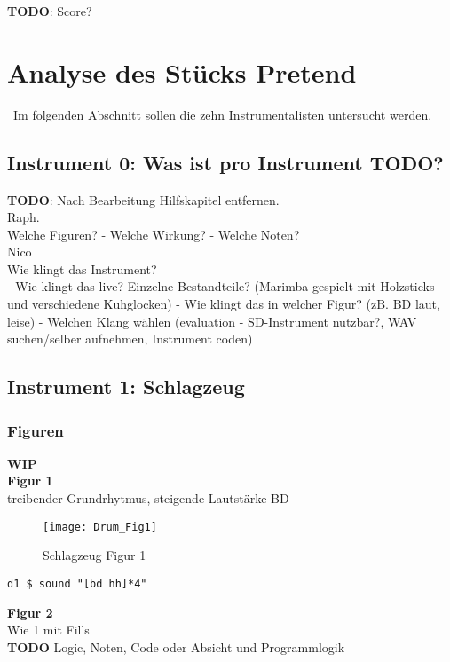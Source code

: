 \documentclass[
10pt, %
a4paper, %
oneside, %
headinclude,footinclude, %
BCOR5mm, %
]{scrartcl}
\begin{document}
{\color{red}\textbf{TODO}}: Score?

\section{Analyse des Stücks Pretend}\
Im folgenden Abschnitt sollen die zehn Instrumentalisten untersucht werden.

\subsection{Instrument 0: Was ist pro Instrument TODO?}
{\color{red}\textbf{TODO}}: Nach Bearbeitung Hilfskapitel entfernen.\\

Raph.\\
Welche Figuren?
- Welche Wirkung?
- Welche Noten?\\

Nico\\
Wie klingt das Instrument?\\
- Wie klingt das live? Einzelne Bestandteile? (Marimba gespielt mit Holzsticks und verschiedene Kuhglocken)
- Wie klingt das in welcher Figur? (zB. BD laut, leise)
- Welchen Klang wählen (evaluation - SD-Instrument nutzbar?, WAV suchen/selber aufnehmen, Instrument coden)\\

\subsection{Instrument 1: Schlagzeug}
\subsubsection{Figuren}
{\color{orange}\textbf{WIP}} \\

\textbf{Figur 1}\\
treibender Grundrhytmus, steigende Lautstärke BD
\begin{figure}[h]
	\centering 
	\texttt{[image: Drum\_Fig1]} 
	\caption{Schlagzeug Figur 1}
\end{figure}

\begin{lstlisting}
d1 $ sound "[bd hh]*4"
\end{lstlisting}

\noindent \textbf{Figur 2}\\
Wie 1 mit Fills\\
{\color{red}\textbf{TODO}} Logic, Noten, Code oder Absicht und Programmlogik\\
\end{document}
